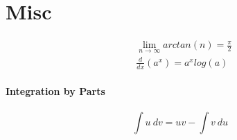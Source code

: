 \documentclass[12 pt]{article}
\theoremstyle{definition}
\begin{document}
\section{Misc}
\begin{align}
	& \lim_{n\to \infty}arctan(n)=\frac{\pi}{2}
	\\&\frac{d}{dx}\left(a^x\right)=a^x log(a)
\end{align}
\paragraph{Integration by Parts}
$$ \int u \ dv = uv - \int v \ du $$
\end{document}
